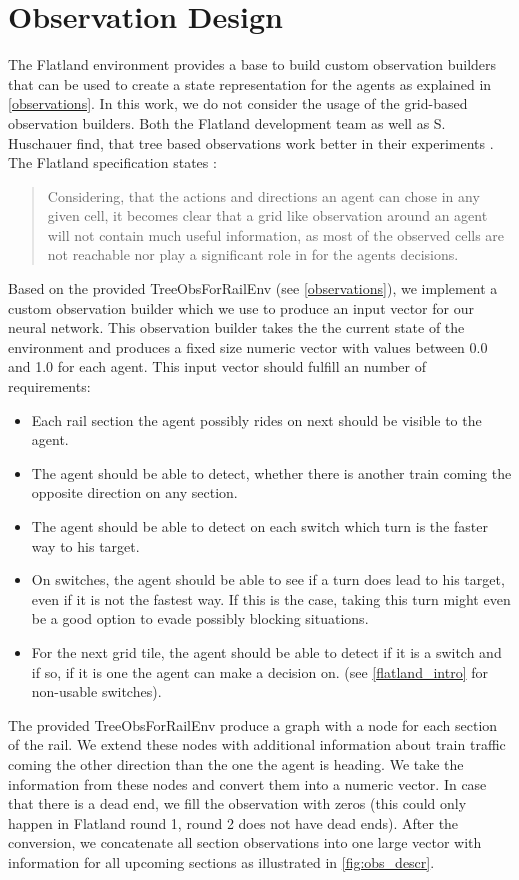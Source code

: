 \section{Observation Design}\label{enhanced_observations}
The Flatland environment provides a base to build custom observation builders that can be used to create a state representation for the agents as explained in \autoref{observations}. In this work, we do not consider the usage of the grid-based observation builders.
Both the Flatland development team as well as S. Huschauer find, that tree based observations work better in their experiments \cite{flatlandstephan}. The Flatland specification states \cite{flatland_spec}:
\begin{quote}
	Considering, that the actions and directions an agent can chose in any given cell, it becomes clear that a grid like observation around an agent will not contain much useful information, as most of the observed cells are not reachable nor play a significant role in for the agents decisions.
\end{quote}
Based on the provided TreeObsForRailEnv (see \autoref{observations}), we implement a custom observation builder which we use to produce an input vector for our neural network. This observation builder takes the the current state of the environment and produces a fixed size numeric vector with values between 0.0 and 1.0 for each agent. This input vector should fulfill an number of requirements:
\begin{itemize}
	\item Each rail section the agent possibly rides on next should be visible to the agent.
	\item The agent should be able to detect, whether there is another train coming the opposite direction on any section.
	\item The agent should be able to detect on each switch which turn is the faster way to his target.
	\item On switches, the agent should be able to see if a turn does lead to his target, even if it is not the fastest way. If this is the case, taking this turn might even be a good option to evade possibly blocking situations.
	\item For the next grid tile, the agent should be able to detect if it is a switch and if so, if it is one the agent can make a decision on. (see \autoref{flatland_intro} for non-usable switches).
\end{itemize}
The provided TreeObsForRailEnv produce a graph with a node for each section of the rail. We extend these nodes with additional information about train traffic coming the other direction than the one the agent is heading. We take the information from these nodes and convert them into a numeric vector. In case that there is a dead end, we fill the observation with zeros (this could only happen in Flatland round 1, round 2 does not have dead ends). After the conversion, we concatenate all section observations into one large vector with information for all upcoming sections as illustrated in \autoref{fig:obs_descr}.\\
